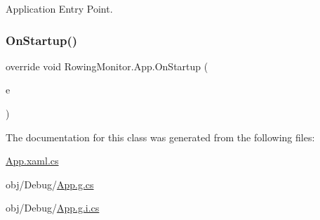 Application Entry Point. 

\mbox{\label{class_rowing_monitor_1_1_app_a66e9b3baf5c2db1300758dddf3156f2f}} 
\subsubsection{\texorpdfstring{On\+Startup()}{OnStartup()}}
{\footnotesize\ttfamily override void Rowing\+Monitor.\+App.\+On\+Startup (\begin{DoxyParamCaption}\item[{Startup\+Event\+Args}]{e }\end{DoxyParamCaption})\hspace{0.3cm}{\ttfamily [protected]}}



The documentation for this class was generated from the following files\+:\begin{DoxyCompactItemize}
\item 
\hyperlink{_app_8xaml_8cs}{App.\+xaml.\+cs}\item 
obj/\+Debug/\hyperlink{_debug_2_app_8g_8cs}{App.\+g.\+cs}\item 
obj/\+Debug/\hyperlink{_debug_2_app_8g_8i_8cs}{App.\+g.\+i.\+cs}\end{DoxyCompactItemize}
